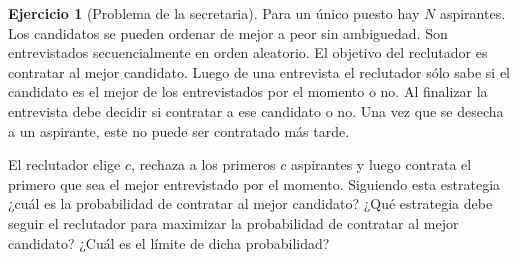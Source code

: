 \documentclass{article}
\theoremstyle{definition}
\newtheorem{exercise}{Ejercicio}
\begin{document}
\begin{exercise}[Problema de la secretaria]
Para un único puesto hay $N$ aspirantes.
Los candidatos se pueden ordenar de mejor a peor sin ambiguedad.
Son entrevistados secuencialmente en orden aleatorio.
El objetivo del reclutador es contratar al mejor candidato.
Luego de una entrevista el reclutador sólo sabe si el candidato es el mejor de los entrevistados por el momento o no.
Al finalizar la entrevista debe decidir si contratar a ese candidato o no.
Una vez que se desecha a un aspirante, este no puede ser contratado más tarde.

El reclutador elige $c$, rechaza a los primeros $c$ aspirantes y luego contrata el primero que sea el mejor entrevistado por el momento.
Siguiendo esta estrategia ¿cuál es la probabilidad de contratar al mejor candidato?
¿Qué estrategia debe seguir el reclutador para maximizar la probabilidad de contratar al mejor candidato?
¿Cuál es el límite de dicha probabilidad?
\end{exercise}
\end{document}
